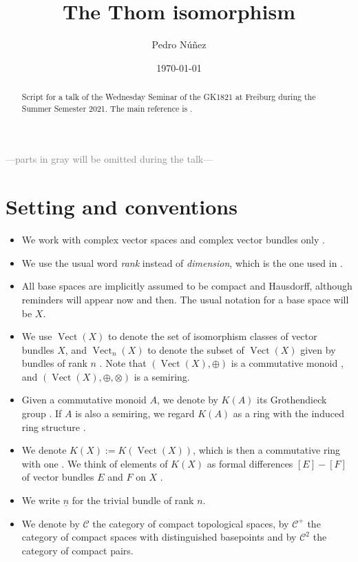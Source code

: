 \documentclass[12pt,a4paper]{amsart}
\title[The Thom isomorphism]{The Thom isomorphism}
\author[Pedro N\'{u}\~{n}ez]{Pedro N\'{u}\~{n}ez}
\date{\today}
\theoremstyle{plain}
\theoremstyle{definition}
\theoremstyle{remark}
\begin{document}
\maketitle

\begin{abstract}
  Script for a talk of the Wednesday Seminar of the GK1821 at Freiburg during the Summer Semester 2021.
  The main reference is \cite[\S 2]{ati67}.
\end{abstract}

\tableofcontents

\begin{center}
  \textcolor{gray}{---parts in gray will be omitted during the talk---}
\end{center}

\section{Setting and conventions}

\begin{itemize}
  \item We work with complex vector spaces and complex vector bundles only \cite[p.~1]{ati67}.
  \item We use the usual word \textit{rank} instead of \textit{dimension}, which is the one used in \cite[p.~3]{ati67}.
  \item All base spaces are implicitly assumed to be compact and Hausdorff, although reminders will appear now and then.
    The usual notation for a base space will be $X$.
  \item We use $\operatorname{Vect}(X)$ to denote the set of isomorphism classes of vector bundles $X$, and $\operatorname{Vect}_{n}(X)$ to denote the subset of $\operatorname{Vect}(X)$ given by bundles of rank $n$ \cite[p.~17]{ati67}.
    Note that $(\operatorname{Vect}(X), \oplus)$ is a commutative monoid \cite[p.~17]{ati67}, and $(\operatorname{Vect}(X), \oplus, \otimes)$ is a semiring.
  \item Given a commutative monoid $A$, we denote by $K(A)$ its Grothendieck group \cite[p.~42]{ati67}.
    If $A$ is also a semiring, we regard $K(A)$ as a ring with the induced ring structure \cite[p.~43]{ati67}.
  \item We denote $K(X) := K(\operatorname{Vect}(X))$, which is then a commutative ring with one \cite[p.~43]{ati67}.
    We think of elements of $K(X)$ as formal differences $[E] - [F]$ of vector bundles $E$ and $F$ on $X$ \cite[p.~44]{ati67}.
  \item We write $\underline{n}$ for the trivial bundle of rank $n$.
  \item We denote by $\mathcal{C}$ the category of compact topological spaces, by $\mathcal{C}^{+}$ the category of compact spaces with distinguished basepoints and by $\mathcal{C}^{2}$ the category of compact pairs.
\end{itemize}
\end{document}

